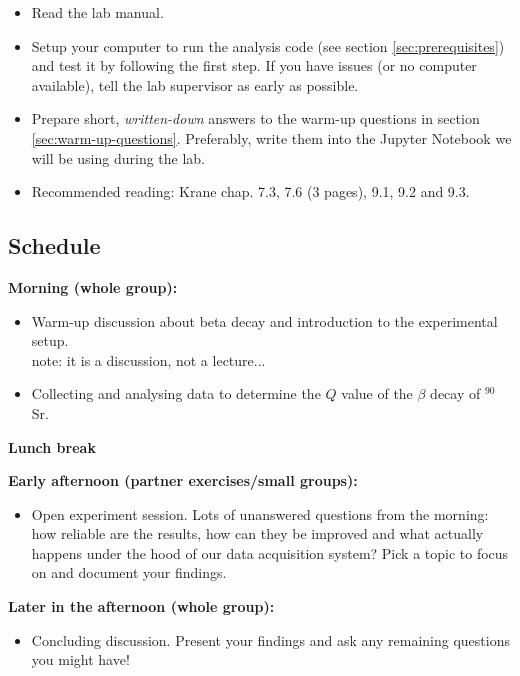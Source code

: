 \documentclass[a4,11pt, notitlepage]{article}
\begin{document}
\begin{itemize}
  
\item Read the lab manual.
\item Setup your computer to run the analysis code (see section \ref{sec:prerequisites})
  and test it by following the first step. If you have issues (or no computer
  available), tell the lab supervisor as early as possible.
\item Prepare short, \emph{written-down} answers to the warm-up questions in
  section \ref{sec:warm-up-questions}. Preferably, write them into the Jupyter
  Notebook we will be using during the lab.
\item Recommended reading: Krane chap. 7.3, 7.6 (3 pages), 9.1, 9.2 and 9.3.
\end{itemize}



\subsection{Schedule}

\noindent\textbf{Morning (whole group):} 
\begin{itemize}
\item Warm-up discussion about beta decay and introduction to the
  experimental setup. \\ note: it is a discussion, not a lecture...
\item Collecting and analysing data to determine the $Q$ value of the
  $\beta$ decay of $^{90}$Sr.
\end{itemize}

\noindent\textbf{Lunch break} 

\noindent\textbf{Early afternoon (partner exercises/small groups):} 
\begin{itemize}
\item Open experiment session. Lots of unanswered questions from the
  morning: how reliable are the results, how can they be improved and
  what actually happens under the hood of our data acquisition system?
  Pick a topic to focus on and document your findings.
\end{itemize}

\noindent\textbf{Later in the afternoon (whole group):} 
\begin{itemize}
\item Concluding discussion. Present your findings and ask any
  remaining questions you might have!
\end{itemize}
\end{document}
